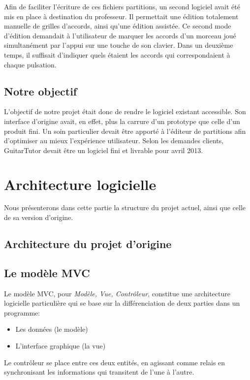 \documentclass[a4paper,11pt]{article}
\begin{document}
Afin de faciliter l'écriture de ces fichiers partitions, un second logiciel avait été mis en place à destination du professeur. Il permettait une édition totalement manuelle de grilles d'accords, ainsi qu'une édition assistée. Ce second mode d'édition demandait à l'utilisateur de marquer les accords d'un morceau joué simultanément par l'appui sur une touche de son clavier. Dans un deuxième temps, il suffisait d'indiquer quels étaient les accords qui correspondaient à chaque pulsation.

\subsection*{Notre objectif}

L'objectif de notre projet était donc de rendre le logiciel existant accessible. Son interface d'origine avait, en effet, plus la carrure d'un prototype que celle d'un produit fini. Un soin particulier devait être apporté à l'éditeur de partitions afin d'optimiser au mieux l'expérience utilisateur. Selon les demandes clients, GuitarTutor devait être un logiciel fini et livrable pour avril 2013.

\clearpage

\tableofcontents

\clearpage

\section{Architecture logicielle}

Nous présenterons dans cette partie la structure du projet actuel, ainsi que celle de sa version d'origine.

\subsection{Architecture du projet d'origine}

\subsection{Le modèle MVC}

Le modèle MVC, pour \textit{Modèle, Vue, Contrôleur}, constitue une architecture logicielle particulière qui se base sur la différenciation de deux parties dans un programme:
\begin{itemize}
 \item Les données (le modèle)
 \item L'interface graphique (la vue)
\end{itemize}
Le contrôleur se place entre ces deux entités, en agissant comme relais en synchronisant les informations qui transitent de l'une à l'autre.\\
\end{document}
